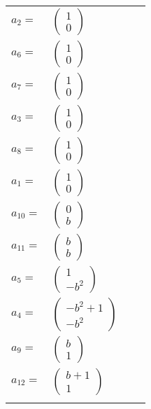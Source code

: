 \documentclass[1p]{elsarticle_modified}
\theoremstyle{definition}
\begin{document}
\begin{tabular}{m{7pt} m{180pt} m{7pt} m{180pt} }
\flushright $a_{2}=$&$\begin{pmatrix}1\\0\end{pmatrix}$ \\
\flushright $a_{6}=$&$\begin{pmatrix}1\\0\end{pmatrix}$ \\
\flushright $a_{7}=$&$\begin{pmatrix}1\\0\end{pmatrix}$ \\
\flushright $a_{3}=$&$\begin{pmatrix}1\\0\end{pmatrix}$ \\
\flushright $a_{8}=$&$\begin{pmatrix}1\\0\end{pmatrix}$ \\
\flushright $a_{1}=$&$\begin{pmatrix}1\\0\end{pmatrix}$ \\
\flushright $a_{10}=$&$\begin{pmatrix}0\\b\end{pmatrix}$ \\
\flushright $a_{11}=$&$\begin{pmatrix}b\\b\end{pmatrix}$ \\
\flushright $a_{5}=$&$\begin{pmatrix}1\\- b^2\end{pmatrix}$ \\
\flushright $a_{4}=$&$\begin{pmatrix}- b^2+1\\- b^2\end{pmatrix}$ \\
\flushright $a_{9}=$&$\begin{pmatrix}b\\1\end{pmatrix}$ \\
\flushright $a_{12}=$&$\begin{pmatrix}b+1\\1\end{pmatrix}$\\&\end{tabular}
\end{document}

